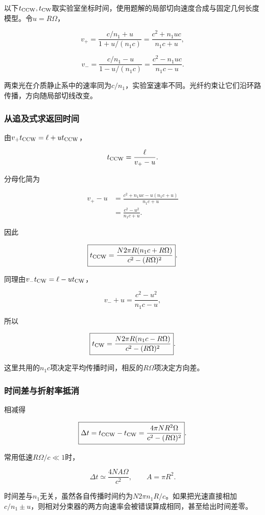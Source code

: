 \documentclass[12pt,a4paper,fontset=fandol]{ctexart}
\begin{document}
以下\(t_{\rm CCW},t_{\rm CW}\)取实验室坐标时间，使用题解的局部切向速度合成与固定几何长度模型。令\(u=R\Omega\)，

\[
v_+=\frac{c/n_1+u}{1+u/(n_1c)}
=\frac{c^2+n_1uc}{n_1c+u},
\]

\[
v_-=\frac{c/n_1-u}{1-u/(n_1c)}
=\frac{c^2-n_1uc}{n_1c-u}.
\]

两束光在介质静止系中的速率同为\(c/n_1\)，实验室速率不同。光纤约束让它们沿环路传播，方向随局部切线改变。

\subsubsection{从追及式求返回时间}\label{ux4eceux8ffdux53caux5f0fux6c42ux8fd4ux56deux65f6ux95f4}

由\(v_+t_{\rm CCW}=\ell+ut_{\rm CCW}\)，

\[
t_{\rm CCW}=\frac{\ell}{v_+-u}.
\]

分母化简为

\[
\begin{aligned}
v_+-u
&=\frac{c^2+n_1uc-u(n_1c+u)}{n_1c+u}\\
&=\frac{c^2-u^2}{n_1c+u}.
\end{aligned}
\]

因此

\[
\boxed{
t_{\rm CCW}
=\frac{N2\pi R(n_1c+R\Omega)}
{c^2-(R\Omega)^2}}.
\]

同理由\(v_-t_{\rm CW}=\ell-ut_{\rm CW}\)，

\[
v_-+u=\frac{c^2-u^2}{n_1c-u},
\]

所以

\[
\boxed{
t_{\rm CW}
=\frac{N2\pi R(n_1c-R\Omega)}
{c^2-(R\Omega)^2}}.
\]

这里共用的\(n_1c\)项决定平均传播时间，相反的\(R\Omega\)项决定方向差。

\subsubsection{时间差与折射率抵消}\label{ux65f6ux95f4ux5deeux4e0eux6298ux5c04ux7387ux62b5ux6d88}

相减得

\[
\boxed{
\Delta t=t_{\rm CCW}-t_{\rm CW}
=\frac{4\pi NR^2\Omega}
{c^2-(R\Omega)^2}}.
\]

常用低速\(R\Omega/c\ll1\)时，

\[
\boxed{\Delta t\simeq\frac{4N A\Omega}{c^2}},
\qquad A=\pi R^2.
\]

时间差与\(n_1\)无关，虽然各自传播时间约为\(N2\pi n_1R/c\)。如果把光速直接相加\(c/n_1\pm u\)，则相对分束器的两方向速率会被错误算成相同，甚至给出时间差零。
\end{document}
